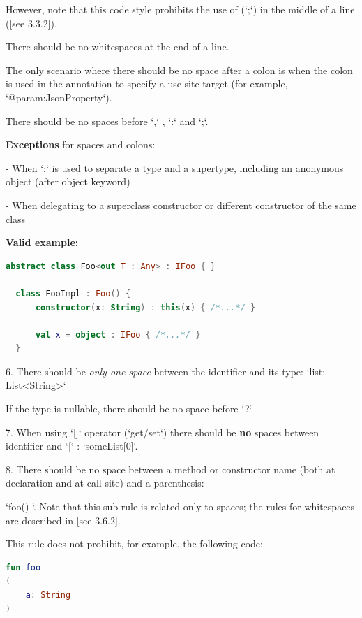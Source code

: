 {{{{    However, note that this code style prohibits the use of (`;`) in the middle of a line ([see 3.3.2]).

    There should be no whitespaces at the end of a line.

    The only scenario where there should be no space after a colon is when the colon is used in the annotation to specify a use-site target (for example, `@param:JsonProperty`).

    There should be no spaces before `,` , `:` and `;`. 

    

    \textbf{Exceptions} for spaces and colons:

    

    - When `:` is used to separate a type and a supertype, including an anonymous object (after object keyword)

    - When delegating to a superclass constructor or different constructor of the same class



\textbf{Valid example:}

\begin{lstlisting}[language=Kotlin]
  abstract class Foo<out T : Any> : IFoo { }
  
  class FooImpl : Foo() {
      constructor(x: String) : this(x) { /*...*/ }
      
      val x = object : IFoo { /*...*/ } 
  }
\end{lstlisting}


6. There should be \textit{only one space} between the identifier and its type: `list: List<String>`

If the type is nullable, there should be no space before `?`.



7. When using `[]` operator (`get/set`) there should be \textbf{no} spaces between identifier and `[` : `someList[0]`.



8. There should be no space between a method or constructor name (both at declaration and at call site) and a parenthesis:

   `foo() {}`. Note that this sub-rule is related only to spaces; the rules for whitespaces are described in [see 3.6.2].

    This rule does not prohibit, for example, the following code:

\begin{lstlisting}[language=Kotlin]
fun foo
(
    a: String
)
\end{lstlisting}


}}}}
